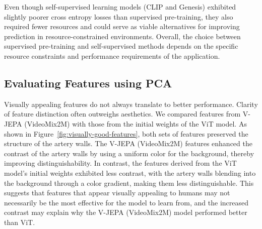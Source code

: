 \documentclass[a4paper,11pt,oneside]{report}
\begin{document}
Even though self-supervised learning models (CLIP and Genesis) exhibited slightly poorer cross entropy losses than supervised pre-training, they also required fewer resources and could serve as viable alternatives for improving prediction in resource-constrained environments. Overall, the choice between supervised pre-training and self-supervised methods depends on the specific resource constraints and performance requirements of the application.

\subsection{Evaluating Features using PCA}
Visually appealing features do not always translate to better performance. Clarity of feature distinction often outweighs aesthetics. We compared features from V-JEPA (VideoMix2M) with those from the initial weights of the ViT model. As shown in Figure~\ref{fig:visually-good-features}, both sets of features preserved the structure of the artery walls. The V-JEPA (VideoMix2M) features enhanced the contrast of the artery walls by using a uniform color for the background, thereby improving distinguishability. In contrast, the features derived from the ViT model's initial weights exhibited less contrast, with the artery walls blending into the background through a color gradient, making them less distinguishable. This suggests that features that appear visually appealing to humans may not necessarily be the most effective for the model to learn from, and the increased contrast may explain why the V-JEPA (VideoMix2M) model performed better than ViT. 
\end{document}
